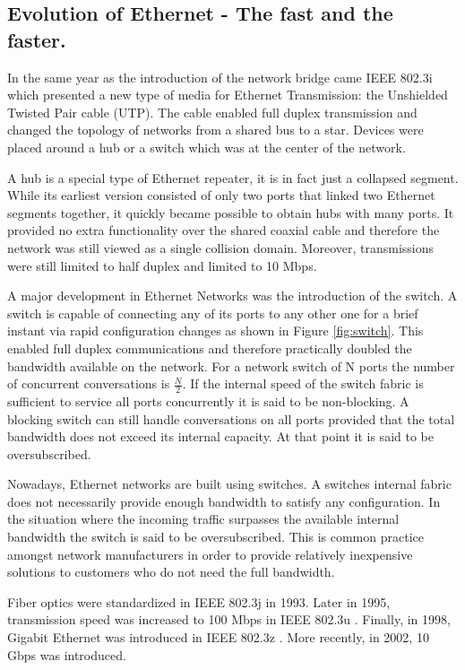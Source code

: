 \subsection{Evolution of Ethernet - The fast and the faster.}

In the same year as the introduction of the network bridge came IEEE 802.3i \cite{IEEE802.3i} which presented a new type of media for Ethernet Transmission: the Unshielded Twisted Pair cable (UTP). The cable enabled full duplex transmission and changed the topology of networks from a shared bus to a star. Devices were placed around a hub or a switch which was at the center of the network.

A hub is a special type of Ethernet repeater, it is in fact just a collapsed segment. While its earliest version consisted of only two ports that linked two Ethernet segments together, it quickly became possible to obtain hubs with many ports. It provided no extra functionality over the shared coaxial cable and therefore the network was still viewed as a single collision domain. Moreover, transmissions were still limited to half duplex and limited to 10 Mbps. 

A major development in Ethernet Networks was the introduction of the switch. A switch is capable of connecting any of its ports to any other one for a brief instant via rapid configuration changes as shown in Figure \ref{fig:switch}. This enabled full duplex communications and therefore practically doubled the bandwidth available on the network.  For a  network switch of N ports the number of concurrent conversations is $\frac{N}{2}$. If the internal speed of the switch fabric is sufficient to service all ports concurrently it is said to be non-blocking. A blocking switch can still handle conversations on all ports provided that the total bandwidth does not exceed its internal capacity. At that point it is said to be oversubscribed.


Nowadays, Ethernet networks are built using switches. A switches internal fabric does not necessarily provide enough bandwidth to satisfy any configuration. In the situation where the incoming traffic surpasses the available internal bandwidth the switch is said to be oversubscribed. This is common practice amongst network manufacturers in order to provide relatively inexpensive solutions to customers who do not need the full bandwidth.

Fiber optics were standardized in IEEE 802.3j \cite{IEEE802.3j} in 1993. Later in 1995, transmission speed was increased to 100 Mbps in IEEE 802.3u \cite{IEEE802.3u}. Finally, in 1998, Gigabit Ethernet was introduced in IEEE 802.3z \cite{IEEE802.3z}. More recently, in 2002, 10 Gbps was introduced.

